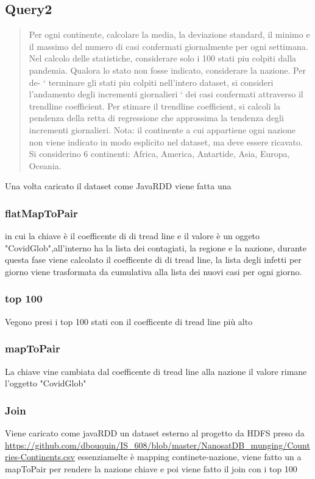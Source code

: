 \documentclass[acmsmall]{acmart}
\begin{document}
\subsection{Query2}
\begin{quote}
Per ogni continente, calcolare la media, la deviazione standard, il minimo e il massimo del numero di
casi confermati giornalmente per ogni settimana. Nel calcolo delle statistiche, considerare solo i 100
stati piu colpiti dalla pandemia. Qualora lo stato non fosse indicato, considerare la nazione. Per de- `
terminare gli stati piu colpiti nell’intero dataset, si consideri l’andamento degli incrementi giornalieri `
dei casi confermati attraverso il trendline coefficient. Per stimare il trendline coefficient, si calcoli la
pendenza della retta di regressione che approssima la tendenza degli incrementi giornalieri.
Nota: il continente a cui appartiene ogni nazione non viene indicato in modo esplicito nel dataset, ma
deve essere ricavato. Si considerino 6 continenti: Africa, America, Antartide, Asia, Europa, Oceania.\end{quote}

Una volta caricato il dataset come JavaRDD viene fatta una 
\subsubsection{flatMapToPair}
in cui la chiave è il coefficente di di tread line e il valore è un oggeto
"CovidGlob",all'interno ha la lista dei contagiati, la regione e la nazione, durante questa fase viene calcolato il coefficente di di tread line, la lista degli infetti per giorno viene trasformata da cumulativa alla lista dei nuovi casi per ogni giorno.
\subsubsection{top 100}
Vegono presi i top 100 stati con il coefficente di tread line più alto

\subsubsection{mapToPair}
La chiave vine cambiata dal coefficente di tread line alla nazione il valore rimane l'oggetto  "CovidGlob"

\subsubsection{Join}
Viene caricato come javaRDD un dataset esterno al progetto da HDFS preso da \\ \url{https://github.com/dbouquin/IS_608/blob/master/NanosatDB_munging/Countries-Continents.csv}   
essenziamelte è mapping continete-nazione, viene fatto un a mapToPair per rendere la nazione chiave e poi viene fatto il join con i top 100
\end{document}
